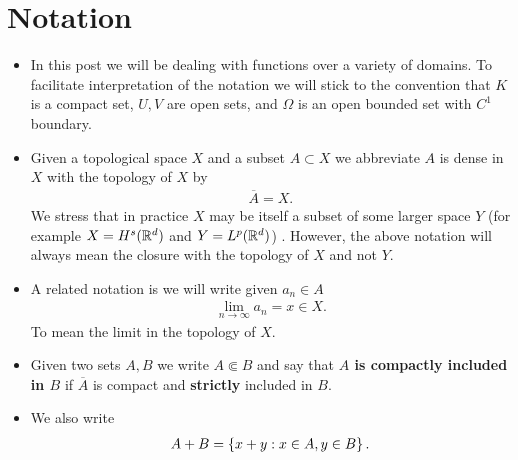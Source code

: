 \documentclass[
    a4paper,
    DIV=14,
    abstract=true,
    numbers=noenddot
]{scrartcl}
\begin{document}
\section{Notation}
\begin{itemize}
	\item     In this post we will be dealing with functions over a variety of domains. To facilitate interpretation of the notation we will stick to the convention that $K$ is a compact set, $U, V$ are open sets, and $\Omega$ is an open bounded set with $C^1$ boundary.
	\item Given a topological space $X$ and a subset  $A \subset X$ we abbreviate $A$ is dense in  $X$ with the topology of  $X$ by
	      \begin{align*}
		      \overline{A}=X.
	      \end{align*}
	      We stress that in practice $X$ may be itself a subset of some larger space  $Y$ (for example $X= H^s(\mathbb{R}^d)$ and $ Y= L^p(\mathbb{R}^d)$) . However, the above notation will always mean the closure with the topology of  $X$ and not  $Y$.
	\item A related notation is we will write given $a_n \in  A$
	      \begin{align*}
		      \lim_{n \to \infty}a_n =x \in X.
	      \end{align*}
	      To mean the limit in the topology of $X$.

	\item     Given two sets $A,B$ we write  $A \Subset B$ and say that \textbf{$A$ is compactly included in  $B$} if $\overline{A}$ is compact and \textbf{strictly} included in $B$.
	\item We also write
	      \begin{align*}
		      A+B=\left\{x+y:x \in A, y \in  B\right\} .
	      \end{align*}


\end{itemize}
\end{document}
